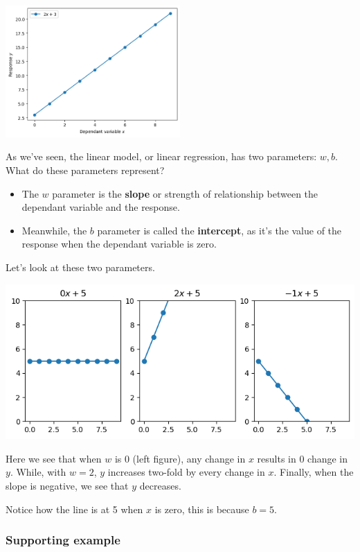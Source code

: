 \documentclass[10pt]{beamer}
\begin{document}
\begin{center}
\includegraphics[width=0.5\textwidth]{images/linear_model.png}
\end{center}

As we've seen, the linear model, or linear regression, has two parameters: \(w,
b\). What do these parameters represent?

\begin{itemize}
\item The \(w\) parameter is the \textbf{slope} or strength of relationship between the dependant
variable and the response.
\item Meanwhile, the \(b\) parameter is called the \textbf{intercept}, as it's the value of the
response when the dependant variable is zero.
\end{itemize}

Let's look at these two parameters.

\begin{center}
\includegraphics[width=.9\linewidth]{images/slope_1.png}
\end{center}

Here we see that when \(w\) is 0 (left figure), any change in \(x\) results in 0 change
in \(y\). While, with \(w = 2\), \(y\) increases two-fold by every change in \(x\). Finally,
when the slope is negative, we see that \(y\) decreases.

Notice how the line is at 5 when \(x\) is zero, this is because \(b = 5\).

\subsubsection*{Supporting example}
\label{sec:orgf27f81d}
\end{document}
